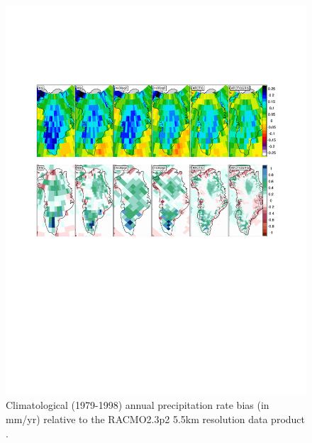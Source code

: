 \documentclass[draft]{agujournal2019}
\begin{document}
\begin{figure}[t]
\begin{center}
         \includegraphics[width=130mm]{figs/temp_contours_diffCERESdiffRACMO_CLOUD_PRECIP.pdf}
\end{center}
\caption{Climatological (1979-1998) annual precipitation rate bias (in mm/yr) relative to the RACMO2.3p2 5.5km resolution data product \cite{NETAL2019SCIENCE}.}
\label{fig:prect}
\end{figure}
\end{document}
